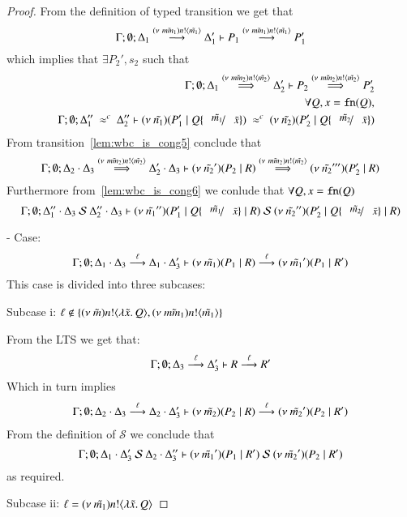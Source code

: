 \begin{proof}
	\noi From the definition of typed transition we get that
	\[
		\horel{\Gamma}{\Delta_1}{P_1}{\by{\news{\tilde{mm_1}} \bactout{n}{\tilde{m_1}}}}{\Delta_1'}{P_1'}
	\]
	\noi which implies that $\exists P_2', s_2$ such that
%
	\begin{eqnarray}
		&& \horel{\Gamma}{\Delta_1}{P_2}{\By{\news{\tilde{mm_2}} \bactout{n}{\tilde{m_2}}}}{\Delta_2'}{P_2'}
		\label{lem:wbc_is_cong5}\\
		&&\forall Q, x = \fn{Q}, \nonumber \\%
		&& \horel{\Gamma}{\Delta_1''}{\newsp{\tilde{n_1}}{P_1' \Par Q \subst{\tilde{m_1}}{\tilde{x}}}}{\ \wbc\ }{\Delta_2''}{\newsp{\tilde{n_2}}{P_2' \Par Q \subst{\tilde{m_2}}{\tilde{x}}}}
		\label{lem:wbc_is_cong6}
	\end{eqnarray}
%
	\noi From transition~\ref{lem:wbc_is_cong5} conclude that 
	\[
		\horel{\Gamma}{\Delta_2 \cat \Delta_3}{\newsp{\tilde{n_2}'}{P_2 \Par R}}{\By{\news{\tilde{mm_2}} \bactout{n}{\tilde{m_2}}}}{\Delta_2' \cat \Delta_3}{\newsp{\tilde{n_2}'''}{P_2' \Par R}}
	\]
%
	\noi Furthermore from~\ref{lem:wbc_is_cong6} we conlude that $\forall Q, x = \fn{Q}$
%
	\[
		\horel{\Gamma}{\Delta_1'' \cat \Delta_3}{\newsp{\tilde{n_1}''}{P_1' \Par Q \subst{\tilde{m_1}}{\tilde{x}} \Par R}}{\ \mathcal{S}\ }{\Delta_2'' \cat \Delta_3}{\newsp{\tilde{n_2}''}{P_2' \Par Q \subst{\tilde{m_2}}{\tilde{x}} \Par R}}
	\]
%

	\noi - Case:
%
	\[
		\horel{\Gamma}{\Delta_1 \cat \Delta_3}{\newsp{\tilde{m_1}}{P_1 \Par R}}{\by{\ell}}{\Delta_1 \cat \Delta_3'}{\newsp{\tilde{m_1}'}{P_1 \Par R'}}
	\]
%
	\noi This case is divided into three subcases:

	\noi Subcase i: $\ell \notin \set{\news{\tilde{m}} \bactout{n}{\abs{\tilde{x}}{Q}}, \news{\tilde{mm_1}} \bactout{n}{\tilde{m_1}}}$

	\noi From the LTS we get that:
	\[
		\horel{\Gamma}{\Delta_3}{R}{\by{\ell}}{\Delta_3'}{R'}
	\]
%
	\noi Which in turn implies
	\begin{eqnarray*}
		\horel{\Gamma}{\Delta_2 \cat \Delta_3}{\newsp{\tilde{m_2}}{P_2 \Par R}}{\by{\ell}}{\Delta_2 \cat \Delta_3'}{\newsp{\tilde{m_2}'}{P_2 \Par R'}}
	\end{eqnarray*}
%
	\noi From the definition of $\mathcal{S}$ we conclude that
	\[
		\horel{\Gamma}{\Delta_1 \cat \Delta_3'}{\newsp{\tilde{m_1}'}{P_1 \Par R'}}{\ \mathcal{S}\ }{\Delta_2 \cat \Delta_3''}{\newsp{\tilde{m_2}'}{P_2 \Par R'}}
	\]
	\noi as required.

	\noi Subcase ii: $\ell = \news{\tilde{m_1}} \bactout{n}{\abs{\tilde{x}}{Q}}$


\end{proof}
